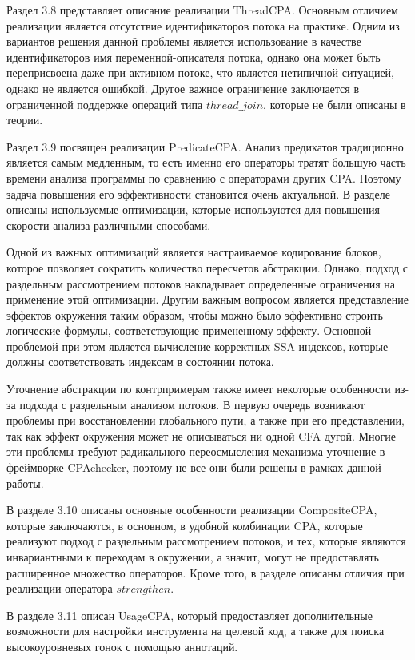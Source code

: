 Раздел 3.8 представляет описание реализации ThreadCPA.
Основным отличием реализации является отсутствие идентификаторов потока на практике. 
Одним из вариантов решения данной проблемы является использование в качестве идентификаторов имя переменной-описателя потока, однако она может быть переприсвоена даже при активном потоке, что является нетипичной ситуацией, однако не является ошибкой.
Другое важное ограничение заключается в ограниченной поддержке операций типа $thread\_join$, которые не были описаны в теории.

Раздел 3.9 посвящен реализации PredicateCPA.
Анализ предикатов традиционно является самым медленным, то есть именно его операторы тратят большую часть времени анализа программы по сравнению с операторами других CPA.
Поэтому задача повышения его эффективности становится очень актуальной.
В разделе описаны используемые оптимизации, которые используются для повышения скорости анализа различными способами.

Одной из важных оптимизаций является настраиваемое кодирование блоков, которое позволяет сократить количество пересчетов абстракции. 
Однако, подход с раздельным рассмотрением потоков накладывает определенные ограничения на применение этой оптимизации.
Другим важным вопросом является представление эффектов окружения таким образом, чтобы можно было эффективно строить логические формулы, соответствующие примененному эффекту.
Основной проблемой при этом является вычисление корректных SSA-индексов, которые должны соответствовать индексам в состоянии потока.

Уточнение абстракции по контрпримерам также имеет некоторые особенности из-за подхода с раздельным анализом потоков.
В первую очередь возникают проблемы при восстановлении глобального пути, а также при его представлении, так как эффект окружения может не описываться ни одной CFA дугой.
Многие эти проблемы требуют радикального переосмысления механизма уточнение в фреймворке CPAchecker, поэтому не все они были решены в рамках данной работы.

В разделе 3.10 описаны основные особенности реализации CompositeCPA, которые заключаются, в основном, в удобной комбинации CPA, которые реализуют подход с раздельным рассмотрением потоков, и тех, которые являются инвариантными к переходам в окружении, а значит, могут не предоставлять расширенное множество операторов. 
Кроме того, в разделе описаны отличия при реализации оператора $strengthen$.

В разделе 3.11 описан UsageCPA, который предоставляет дополнительные возможности для настройки инструмента на целевой код, а также для поиска высокоуровневых гонок с помощью аннотаций.

